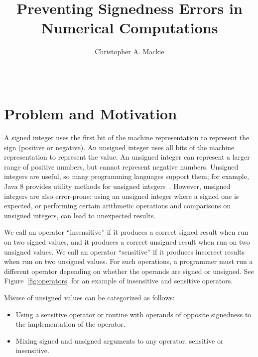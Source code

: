 \documentclass{sig-alternate-05-2015}
\begin{document}
\setlength{\pdfpageheight}{\paperheight}
\setlength{\pdfpagewidth}{\paperwidth}

\title{Preventing Signedness Errors in Numerical Computations}

\author{
Christopher A. Mackie\\
       \\
       \\
}

\maketitle

\section{Problem and Motivation}

A signed integer uses the first bit of the machine representation to
represent the sign (positive or negative).  An unsigned integer uses all
bits of the machine representation to represent the value.
An unsigned integer can represent a larger range of positive numbers, but
cannot represent negative numbers.
Unsigned integers are useful, so many programming languages support them;
for example, Java 8 provides utility methods for unsigned
integers~\cite{JDK8UnsignedIntegerArithmetic2012}.  However, unsigned
integers are also error-prone:  using an unsigned integer where a signed
one is expected, or performing certain arithmetic operations and
comparisons on unsigned integers, can lead to unexpected results.

We call an operator ``insensitive'' if it produces a correct signed result
when run on two signed values, and it produces a correct unsigned result
when run on two unsigned values.  We call an operator ``sensitive'' if it
produces incorrect results when run on two unsigned values.  For such
operations, a programmer must run a different operator depending on whether
the operands are signed or unsigned.  See Figure~\ref{fig:operators} for
an example of insensitive and sensitive operators.

Misuse of unsigned values can be categorized as follows:

\begin{itemize}\itemsep 0pt \parskip 0pt
  \item Using a sensitive operator or routine with operands of opposite signedness to the implementation of the operator.
  \item Mixing signed and unsigned arguments to any operator, sensitive or insensitive.
\end{itemize}
\end{document}
